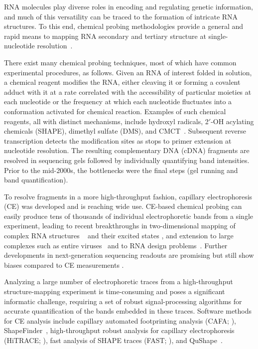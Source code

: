 
RNA molecules play diverse roles in encoding and regulating genetic information, and much of this versatility can be traced to the formation of intricate RNA structures. To this end, chemical probing methodologies provide a general and rapid means to mapping RNA secondary and tertiary structure at single-nucleotide resolution~\citep{weeks2010}.

There exist many chemical probing techniques, most of which have common experimental procedures, as follows. Given an RNA of interest folded in solution, a chemical reagent modifies the RNA, either cleaving it or forming a covalent adduct with it at a rate correlated with the accessibility of particular moieties at each nucleotide or the frequency at which each nucleotide fluctuates into a conformation activated for chemical reaction. Examples of such chemical reagents, all with distinct mechanisms, include hydroxyl radicals, 2$'$-OH acylating chemicals (SHAPE), dimethyl sulfate (DMS), and CMCT~\citep{weeks2010}. Subsequent reverse transcription detects the modification sites as stops to primer extension at nucleotide resolution. The resulting complementary DNA (cDNA) fragments are resolved in sequencing gels followed by individually quantifying band intensities. Prior to the mid-2000s, the bottlenecks were the final steps (gel running and band quantification).

To resolve fragments in a more high-throughput fashion, capillary electrophoresis (CE) was developed and is reaching wide use. CE-based chemical probing can easily produce tens of thousands of individual electrophoretic bands from a single experiment, leading to recent breakthroughs in two-dimensional mapping of complex RNA structures ~\citep{kladwangmutatemap2011} and their excited states \citep{tian2014nature}, and extension to large complexes such as entire viruses~\citep{weeksnature2009} and to RNA design problems~\citep{lee2014eterna}. Further developments in next-generation sequencing readouts are promising but still show biases compared to CE measurements \citep{Lucks2011,Kladwang2014}.

Analyzing a large number of electrophoretic traces from a high-throughput structure-mapping experiment is time-consuming and poses a significant informatic challenge, requiring a set of robust signal-processing algorithms for accurate quantification of the bands embedded in these traces. Software methods for CE analysis include capillary automated footprinting analysis (CAFA; \citealp{mitra2008high}), ShapeFinder~\citep{vasa2008shapefinder}, high-throughput robust analysis for capillary electrophoresis (HiTRACE; \citealp{Yoon2011}), fast analysis of SHAPE traces (FAST; \citealp{Pang2011}), and QuShape~\citep{Karabiber2013}.

